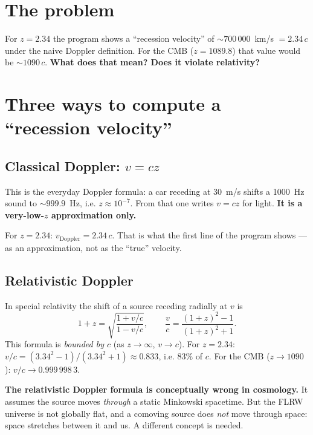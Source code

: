 \documentclass[11pt,a4paper,openany]{report}
\begin{document}
\section{The problem}

For $z = 2.34$ the program shows a “recession velocity” of
$\sim 700\,000$~km/s $= 2.34\,c$ under the naive Doppler definition. For the CMB
($z = 1089.8$) that value would be $\sim 1090\,c$. \textbf{What does that mean?
Does it violate relativity?}

\section{Three ways to compute a “recession velocity”}

\subsection{Classical Doppler: $v = cz$}

\begin{tcolorbox}[plain]
This is the everyday Doppler formula: a car receding at $30$~m/s shifts a
1000~Hz sound to $\sim 999.9$~Hz, i.e. $z\approx 10^{-7}$. From that one writes
$v = cz$ for light. \textbf{It is a very-low-$z$ approximation only.}
\end{tcolorbox}

For $z=2.34$: $v_{\text{Doppler}} = 2.34\,c$. That is what the first line of the
program shows --- as an approximation, not as the “true” velocity.

\subsection{Relativistic Doppler}

In special relativity the shift of a source receding radially at $v$ is
\[
1 + z = \sqrt{\frac{1 + v/c}{1 - v/c}}, \qquad
\frac{v}{c} = \frac{(1+z)^{2} - 1}{(1+z)^{2} + 1}.
\]
This formula is \emph{bounded by $c$} (as $z \to \infty$, $v\to c$). For
$z=2.34$: $v/c = (3.34^{2}-1)/(3.34^{2}+1) \approx 0.833$, i.e. $83\%$ of $c$.
For the CMB ($z\to 1090$): $v/c \to 0.999\,998\,3$.

\begin{tcolorbox}[warning]
\textbf{The relativistic Doppler formula is conceptually wrong in cosmology.}
It assumes the source moves \emph{through} a static Minkowski spacetime. But
the FLRW universe is not globally flat, and a comoving source does \emph{not}
move through space: space stretches between it and us. A different concept is
needed.
\end{tcolorbox}
\end{document}
